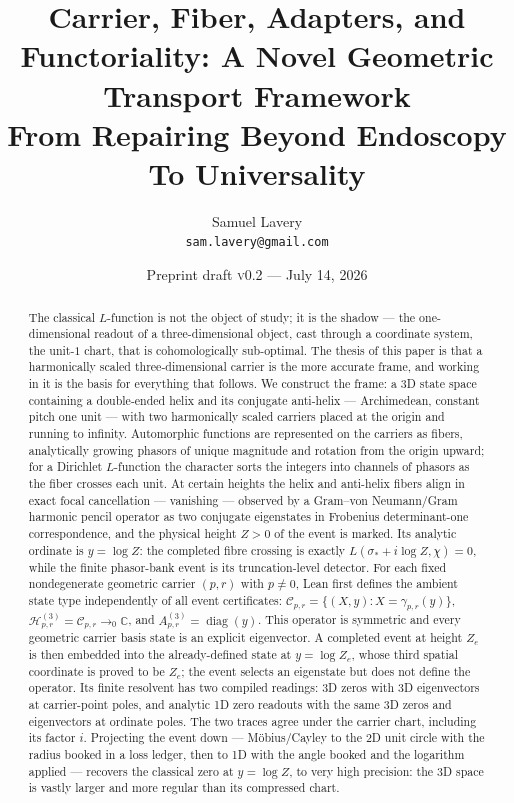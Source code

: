 \documentclass[11pt]{article}
\title{Carrier, Fiber, Adapters, and Functoriality:
A Novel Geometric Transport Framework \\  From Repairing Beyond Endoscopy To Universality }
\author{Samuel Lavery\\ \texttt{sam.lavery@gmail.com}}
\date{Preprint draft \textsc{v0.2} --- July 14, 2026}
\theoremstyle{definition}
\begin{document}
\maketitle

\begin{abstract}
The classical $L$-function is not the object of study; it is the shadow ---
the one-dimensional readout of a three-dimensional object, cast through a
coordinate system, the unit-$1$ chart, that is cohomologically sub-optimal.
The thesis of this paper is that a harmonically scaled three-dimensional
carrier is the more accurate frame, and working in it is the basis for
everything that follows. We construct the frame: a 3D state
space containing a double-ended helix and its conjugate anti-helix ---
Archimedean, constant pitch one unit --- with two harmonically scaled carriers
placed at the origin and running to infinity. Automorphic functions are
represented on the carriers as fibers, analytically growing phasors of unique
magnitude and rotation from the origin upward; for a Dirichlet $L$-function
the character sorts the integers into channels of phasors as the fiber crosses
each unit. At certain heights the helix and anti-helix fibers align in exact
focal cancellation --- vanishing --- observed by a Gram--von Neumann/Gram
harmonic pencil operator as two conjugate eigenstates in Frobenius
determinant-one correspondence, and the physical height $Z>0$ of the event is
marked.  Its analytic ordinate is $y=\log Z$: the completed fibre crossing
is exactly $L(\sigma_*+i\log Z,\chi)=0$, while the finite phasor-bank event
is its truncation-level detector.
For each fixed nondegenerate geometric carrier $(p,r)$ with $p\ne0$, Lean first defines the ambient state
type independently of all event certificates:
\(\mathcal C_{p,r}=\{(X,y):X=\gamma_{p,r}(y)\}\),
\(\mathcal H^{(3)}_{p,r}=\mathcal C_{p,r}\to_0\mathbb C\), and
\(A^{(3)}_{p,r}=\operatorname{diag}(y)\).  This operator is symmetric and every
geometric carrier basis state is an explicit eigenvector.  A completed event
at height $Z_e$ is then embedded into the already-defined state at
$y=\log Z_e$, whose third spatial coordinate is proved to be $Z_e$; the event
selects an eigenstate but does not define the operator.  Its finite resolvent has two compiled
readings: 3D zeros with 3D eigenvectors at carrier-point poles, and analytic
1D zero readouts with the same 3D zeros and eigenvectors at ordinate poles.
The two traces agree under the carrier chart, including its factor \(i\).
Projecting the event down --- M\"obius/Cayley to the 2D unit circle with the
radius booked in a loss ledger, then to 1D with the angle booked and the
logarithm applied --- recovers the classical zero at $y=\log Z$, to very high
precision: the 3D space is vastly larger and more regular than its compressed
chart.


\end{abstract}
\end{document}
